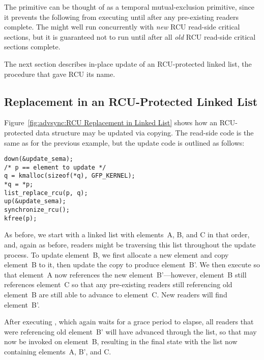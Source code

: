 The  primitive can be thought of as a temporal
mutual-exclusion primitive, since it prevents the following 
from executing until after any pre-existing readers complete.
The  might well run concurrently with \emph{new}
RCU read-side critical sections, but it is guaranteed not to run
until after all \emph{old} RCU read-side critical sections complete.

The next section describes in-place update of an RCU-protected
linked list, the procedure that gave RCU its name.

\subsection{Replacement in an RCU-Protected Linked List}
\label{sec:advsync:Replacement in an RCU-Protected Linked List}

Figure~\ref{fig:advsync:RCU Replacement in Linked List}
shows how an RCU-protected data structure may be updated via
copying.
The read-side code is the same as for the previous example, but
the update code is outlined as follows:

\vspace{5pt}
\begin{minipage}[t]{\columnwidth}
\begin{verbatim}
down(&update_sema);
/* p == element to update */
q = kmalloc(sizeof(*q), GFP_KERNEL);
*q = *p;
list_replace_rcu(p, q);
up(&update_sema);
synchronize_rcu();
kfree(p);
\end{verbatim}
\end{minipage}
\vspace{5pt}

As before, we start with a linked list with elements~A, B, and C
in that order, and, again as before, readers might be traversing
this list throughout the update process.
To update element~B, we first allocate a new element and copy element~B
to it, then update the copy to produce element~B'.
We then execute  so that element~A now
references the new element~B'---however, element~B still references
element~C so that any pre-existing readers still referencing old element~B
are still able to advance to element~C.
New readers will find element~B'.

After executing , which again waits for a grace
period to elapse, all readers that were referencing old element~B'
will have advanced through the list, so that  may now
be invoked on element~B, resulting in the final state with the list
now containing elements~A, B', and C.

